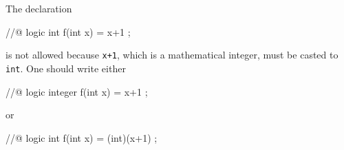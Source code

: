 \begin{example}
  The declaration
  \begin{listing-nonumber}
    //@ logic int f(int x) = x+1 ;
  \end{listing-nonumber}
  is not allowed because \lstinline!x+1!, which is a mathematical
  integer, must be casted to \lstinline|int|.  One should write either
  \begin{listing-nonumber}
    //@ logic integer f(int x) = x+1 ;
  \end{listing-nonumber}
  or
  \begin{listing-nonumber}
    //@ logic int f(int x) = (int)(x+1) ;
  \end{listing-nonumber}
\end{example}